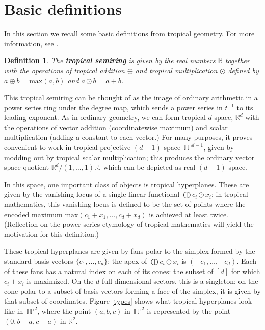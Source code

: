 \documentclass[11pt]{amsart}
\newtheorem{defn}[thm]{Definition}
\newcommand{\RR}{\mathbb{R}}
\newcommand{\TP}{\mathbb{TP}}
\begin{document}


\section{Basic definitions}\label{sec:defs}
In this section we recall some basic definitions from tropical geometry. For more
information, see \cite{DS, SS}.

\begin{defn}
The \textbf{tropical semiring} is given by the real numbers $\RR$ together with the 
operations of tropical addition $\oplus$ and tropical multiplication $\odot$ 
defined by $a\oplus b = \text{max}(a, b)$ and $a\odot b = a + b$.
\end{defn}

This tropical semiring can be 
thought of as the image of ordinary arithmetic in a power series ring under the 
degree map, which sends a power series in $t^{-1}$ to its leading exponent. 
As in ordinary geometry, 
we can form tropical $d$-space, $\RR^d$ with the operations of vector addition 
(coordinatewise maximum) and scalar multiplication (adding a constant to each 
vector.) For many purposes, it proves convenient to work in tropical projective 
$(d-1)$-space $\TP^{d-1}$, given by modding out by tropical scalar multiplication; 
this produces the ordinary vector space quotient $\RR^d / (1, \ldots, 1)\RR$, which 
can be depicted as real $(d-1)$-space.

In this space, one important class of objects is tropical hyperplanes. These are
given by the vanishing locus of a single linear functional $\bigoplus c_i\odot 
x_i$; in tropical mathematics, this vanishing locus is defined to be the set of 
points where the encoded maximum $\text{max}(c_1+x_1,\ldots, c_d+x_d)$ is 
achieved at least twice. (Reflection on the power series etymology of tropical 
mathematics will yield the motivation for this definition.)

These tropical hyperplanes are given by fans polar to the simplex formed by the 
standard basis vectors $\{e_1, \ldots, e_d\}$; the apex of $\bigoplus c_i \odot 
x_i$ is $(-c_1, \ldots, -c_d)$. Each of these fans has a natural index on 
each of its cones: the subset of $[d]$ for which $c_i + x_i$ is maximized. On the 
$d$ full-dimensional sectors, this is a singleton; on the cone polar to a subset of 
basis vectors forming a face of the simplex, it is given by that subset of 
coordinates. Figure \ref{types} shows what tropical hyperplanes look
like in $\TP^2$, where the point $(a,b,c)$ in $\TP^2$ is represented by the 
point $(0,b-a,c-a)$ in $\RR^2$.
\end{document}
